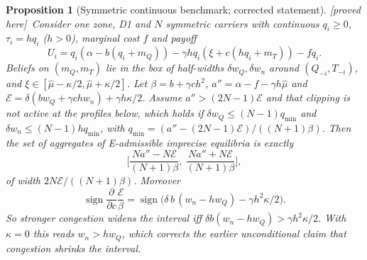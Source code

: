 \documentclass[11pt]{article}
\newtheorem{proposition}[theorem]{Proposition}
\theoremstyle{definition}
\theoremstyle{remark}
\newcommand{\PROVED}{\textsf{[proved here]}}
\begin{document}
\begin{proposition}[Symmetric continuous benchmark; corrected statement]\label{prop:sym} \PROVED\
Consider one zone, D1 and $N$ symmetric carriers with continuous $q_i\ge0$, $\tau_i=hq_i$ ($h>0$), marginal cost $f$ and payoff
\[U_i=q_i(\alpha-b(q_i+m_Q))-\gamma hq_i(\xi+c(hq_i+m_T))-fq_i.\]
Beliefs on $(m_Q,m_T)$ lie in the box of half-widths $\delta w_Q,\delta w_n$ around $(Q_{-i},T_{-i})$, and $\xi\in[\hat\mu-\kappa/2,\hat\mu+\kappa/2]$. Let $\beta=b+\gamma ch^2$, $a''=\alpha-f-\gamma h\hat\mu$ and $\mathcal E=\delta(bw_Q+\gamma chw_n)+\gamma h\kappa/2$. Assume $a''>(2N-1)\mathcal E$ and that clipping is not active at the profiles below, which holds if $\delta w_Q\le(N-1)q_{\min}$ and $\delta w_n\le(N-1)hq_{\min}$, with $q_{\min}=(a''-(2N-1)\mathcal E)/((N+1)\beta)$. Then the set of aggregates of E-admissible imprecise equilibria is exactly
\[\Big[\frac{Na''-N\mathcal E}{(N+1)\beta},\ \frac{Na''+N\mathcal E}{(N+1)\beta}\Big],\]
of width $2N\mathcal E/((N+1)\beta)$. Moreover
\[\operatorname{sign}\frac{\partial}{\partial c}\frac{\mathcal E}{\beta}=\operatorname{sign}\Big(\delta\,b\,(w_n-hw_Q)-\gamma h^2\kappa/2\Big).\]
So stronger congestion \emph{widens} the interval iff $\delta b(w_n-hw_Q)>\gamma h^2\kappa/2$. With $\kappa=0$ this reads $w_n>hw_Q$, which corrects the earlier unconditional claim that congestion shrinks the interval.
\end{proposition}
\end{document}
